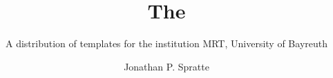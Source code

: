 \documentclass[oneside,UKenglish]{MRTthesis}
\title{The \cls{MRTbundle}}
\subtitle
  {A distribution of templates for the institution MRT, University of Bayreuth}
\author{Jonathan P. Spratte}
\begin{document}
\maketitle
\tableofcontents
\mainpart






\end{document}
